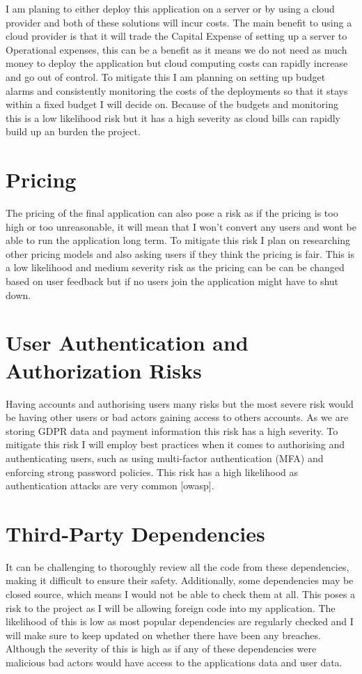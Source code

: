 \documentclass[]{project_report}
\begin{document}
I am planing to either deploy this application on a server or by using a cloud provider and both of these solutions will incur costs. The main benefit to using a cloud provider is that it will trade the Capital Expense of setting up a server to Operational expenses, this can be a benefit as it means we do not need as much money to deploy the application but cloud computing costs can rapidly increase and go out of control. To mitigate this I am planning on setting up budget alarms and consistently monitoring the costs of the deployments so that it stays within a fixed budget I will decide on. Because of the budgets and monitoring this is a low likelihood risk but it has a high severity as cloud bills can rapidly build up an burden the project.

\section{Pricing}
The pricing of the final application can also pose a risk as if the pricing is too high or too unreasonable, it will mean that I won't convert any users and wont be able to run the application long term. To mitigate this risk I plan on researching other pricing models and also asking users if they think the pricing is fair. This is a low likelihood  and medium severity risk as the pricing can be can be changed based on user feedback but if no users join the application might have to shut down.


\section{User Authentication and Authorization Risks}

Having accounts and authorising users many risks but the most severe risk would be having other users or bad actors gaining access to others accounts. As we are storing GDPR data and payment information this risk has a high severity. To mitigate this risk I will employ best practices when it comes to authorising and authenticating users, such as using multi-factor authentication (MFA) and enforcing strong password policies. This risk has a high likelihood as authentication attacks are very common [owasp].

\section{Third-Party Dependencies}

It can be challenging to thoroughly review all the code from these dependencies, making it difficult to ensure their safety. Additionally, some dependencies may be closed source, which means I would not be able to check them at all. This poses a risk to the project as I will be allowing foreign code into my application. The likelihood of this is low as most popular dependencies are regularly checked and I will make sure to keep updated on whether there have been any breaches. Although the severity of this is high as if any of these dependencies were malicious bad actors would have access to the applications data and user data.
\end{document}

